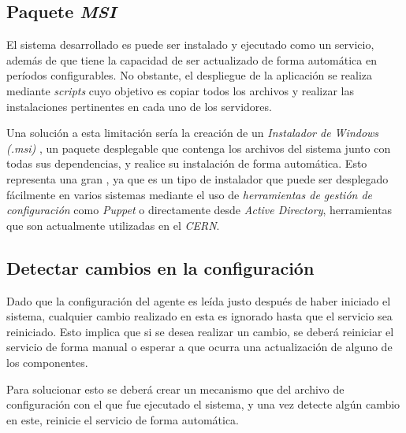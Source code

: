     \subsection{Paquete \textit{MSI}}
        El sistema desarrollado es puede ser instalado y ejecutado como un servicio, además de que tiene la capacidad de ser actualizado de forma automática en períodos configurables. No obstante, el despliegue de la aplicación se realiza mediante \textit{scripts} cuyo objetivo es copiar todos los archivos y realizar las instalaciones pertinentes en cada uno de los servidores.
        
        Una solución a esta limitación sería la creación de un \textit{Instalador de Windows (.msi)} \cite{msi}, un paquete desplegable que contenga los archivos del sistema junto con todas sus dependencias, y realice su instalación de forma automática. Esto representa una gran , ya que es un tipo de instalador que puede ser desplegado fácilmente en varios sistemas mediante el uso de \textit{herramientas de gestión de configuración} \cite{configmanag} como \textit{Puppet}\cite{puppet} o directamente desde \textit{Active Directory}, herramientas que son actualmente utilizadas en el \textit{CERN}.

    \subsection{Detectar cambios en la configuración}
        Dado que la configuración del agente es leída justo después de haber iniciado el sistema, cualquier cambio realizado en esta es ignorado hasta que el servicio sea reiniciado. Esto implica que si se desea realizar un cambio, se deberá reiniciar el servicio de forma manual o esperar a que ocurra una actualización de alguno de los componentes.
        
        Para solucionar esto se deberá crear un mecanismo que  del archivo de configuración con el que fue ejecutado el sistema, y una vez detecte algún cambio en este, reinicie el servicio de forma automática.

